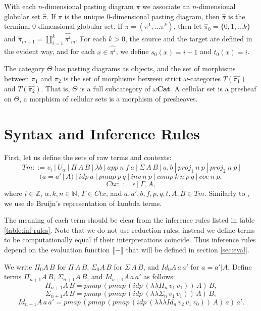 \documentclass{amsart}
\theoremstyle{definition}
\theoremstyle{remark}
\newcommand{\cat}[1]{\mathbf{#1}}
\newcommand{\nats}{\mathbb{N}}
\newcommand{\Z}{\mathbb{Z}}
\newcommand{\ocat}{\omega \cat{Cat}}
\numberwithin{table}{section}
\begin{document}
With each $n$-dimensional pasting diagram $\pi$ we associate an $n$-dimensional globular set $\widehat{\pi}$.
If $\pi$ is the unique $0$-dimensional pasting diagram, then $\widehat{\pi}$ is the terminal $0$-dimensional globular set.
If $\pi = (\pi^1, \ldots \pi^k)$, then let $\widehat{\pi}_0 = \{0, 1, \ldots k\}$
and $\widehat{\pi}_{m+1} = \coprod \limits_{i = 1}^k \widehat{\pi^i}_m$.
For each $k > 0$, the source and the target are defined in the evident way,
and for each $x \in \widehat{\pi^i}$, we define $s_0(x) = i - 1$ and $t_0(x) = i$.

\begin{defn}
The category $\Theta$ has pasting diagrams as objects, and the set of morphisms between $\pi_1$ and $\pi_2$
is the set of morphisms between strict $\omega$-categories $T(\widehat{\pi_1})$ and $T(\widehat{\pi_2})$.
That is, $\Theta$ is a full subcategory of $\ocat$.
A cellular set is a presheaf on $\Theta$, a morphism of cellular sets is a morphism of presheaves.
\end{defn}

\section{Syntax and Inference Rules}

First, let us define the sets of raw terms and contexts:
\[ Tm ::= v_i\ |\ U_\alpha\ |\ \Pi\,A\,B\ |\ \lambda b\ |\ app\ n\ f\ a\ |\ \Sigma\,A\,B\ |\ a , b\ |\ proj_1\ n\ p\ |\ proj_2\ n\ p\ | \]
\[ (a = a' \,|\, A)\ |\ idp\ a\ |\ pmap\ p\ q\ |\ inv\ n\ p\ |\ comp\ k\ n\ p\ q\ |\ coe\ n\ p, \]
\[ Ctx ::= \epsilon\ |\ \Gamma, A, \]
where $i \in \Z$, $\alpha, k, n \in \nats$, $\Gamma \in Ctx$, and $a, a', b, f, p, q, t, A, B \in Tm$.
Similarly to \cite{norm}, we use de Bruijn's representation of lambda terms.

The meaning of each term should be clear from the inference rules listed in table \ref{table:inf-rules}.
Note that we do not use reduction rules, instead we define terms to be computationally equal if their interpretations coincide.
Thus inference rules depend on the evaluation function $\llbracket - \rrbracket$ that will be defined in section \ref{sec:eval}.

We write $\Pi_0 A\,B$ for $\Pi\,A\,B$, $\Sigma_0 A\,B$ for $\Sigma\,A\,B$, and $Id_0 A\,a\,a'$ for $a = a' | A$.
Define terms $\Pi_{n+1} A\,B$, $\Sigma_{n+1} A\,B$, and $Id_{n+1} A\,a\,a'$ as follows:
\[ \Pi_{n+1} A\,B = pmap\,(pmap\,(idp\ (\lambda \lambda \Pi_n\,v_1\,v_1))\,A)\,B, \]
\[ \Sigma_{n+1} A\,B = pmap\,(pmap\,(idp\ (\lambda \lambda \Sigma_n\,v_1\,v_1))\,A)\,B, \]
\[ Id_{n+1} A\,a\,a' = pmap\,(pmap\,(pmap\,(idp\ (\lambda \lambda \lambda Id_n\,v_2\,v_1\,v_0))\,A)\,a)\,a'. \]
\end{document}
